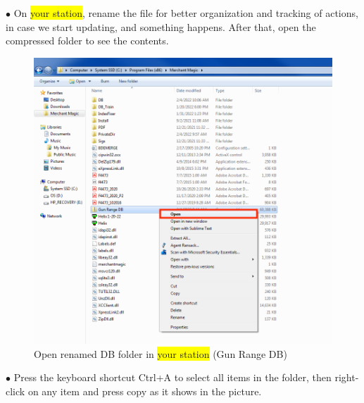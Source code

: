 \documentclass[a4paper, 11pt]{article}
\begin{document}
\pagebreak

\vspace*{\fill}
$\bullet$ On \colorbox{yellow}{your station}, rename the file for better organization and tracking of actions, in case we start updating, and something happens. After that, open the compressed folder to see the contents.

\begin{figure}[h]
    \centering
    \includegraphics[width=\textwidth]{capture 10}
    \caption{Open renamed DB folder in \colorbox{yellow}{your station}  (Gun Range DB)}
\end{figure}
\vspace*{\fill}

\pagebreak

\vspace*{\fill}
$\bullet$ Press the keyboard shortcut Ctrl+A to select all items in the folder, then right-click on any item and press copy as it shows in the picture.
\end{document}
